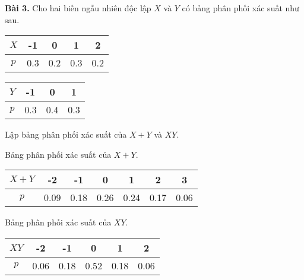 \documentclass[12pt,a4paper]{article}
\begin{document}
\begin{mybox}
   \textbf{Bài 3.} Cho hai biến ngẫu nhiên độc lập $X$ và $Y$ có bảng phân phối xác suất như sau.
    \begin{table}[H]
        \begin{center}
            \begin{tabular}{|c|c|c|c|c|}
                \hline 
                $X$ & -1 & 0 & 1 & 2 \\ 
                \hline 
                $p$ & 0.3 & 0.2 & 0.3 & 0.2 \\ 
                \hline 
                \end{tabular}  
        \end{center}
    \end{table}

    \begin{table}[H]
        \begin{center}
            \begin{tabular}{|c|c|c|c|}
                \hline 
                $Y$ & -1 & 0 & 1 \\ 
                \hline 
                $p$ & 0.3 & 0.4 & 0.3 \\ 
                \hline 
                \end{tabular} 
        \end{center}
    \end{table}
    Lập bảng phân phối xác suất của $X + Y$ và $XY.$
\end{mybox}
Bảng phân phối xác suất của $X + Y.$
\begin{table}[H]
    \begin{center}
        \begin{tabular}{|c|c|c|c|c|c|c|}
            \hline 
            $X + Y$ & -2 & -1 & 0 & 1 & 2 & 3 \\ 
            \hline 
            $p$ & 0.09 & 0.18 & 0.26 & 0.24 & 0.17 & 0.06 \\ 
            \hline 
            \end{tabular} 
    \end{center}
\end{table}
Bảng phân phối xác suất của $XY.$
\begin{table}[H]
    \begin{center}
        \begin{tabular}{|c|c|c|c|c|c|}
            \hline 
            $XY$ & -2 & -1 & 0 & 1 & 2 \\ 
            \hline 
            $p$ & 0.06 & 0.18 & 0.52 & 0.18 & 0.06 \\ 
            \hline 
            \end{tabular} 
    \end{center}
\end{table}
\end{document}
